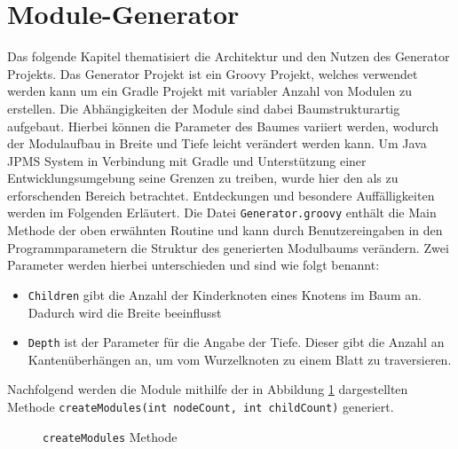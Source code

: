 
\section{Module-Generator}
\label{ch-generator}

Das folgende Kapitel thematisiert die Architektur und den Nutzen des Generator Projekts. 
Das Generator Projekt ist ein Groovy Projekt, welches verwendet werden kann um ein Gradle Projekt mit variabler Anzahl von Modulen zu erstellen.
Die Abhängigkeiten der Module sind dabei Baumstrukturartig aufgebaut.
Hierbei können die Parameter des Baumes variiert werden, wodurch der Modulaufbau in Breite und Tiefe leicht verändert werden kann. 
Um Java JPMS System in Verbindung mit Gradle und Unterstützung einer Entwicklungsumgebung seine Grenzen zu treiben, wurde hier den als zu erforschenden Bereich betrachtet. 
Entdeckungen und besondere Auffälligkeiten werden im Folgenden Erläutert.
Die Datei \texttt{Generator.groovy} enthält die Main Methode der oben erwähnten Routine und kann durch Benutzereingaben in den Programmparametern die Struktur des generierten Modulbaums verändern. 
Zwei Parameter werden hierbei unterschieden und sind wie folgt benannt:

\begin{itemize}
	\item \texttt{Children} gibt die Anzahl der Kinderknoten eines Knotens im Baum an. Dadurch wird die Breite beeinflusst
	\item \texttt{Depth} ist der Parameter für die Angabe der Tiefe. Dieser gibt die Anzahl an Kantenüberhängen an, um vom Wurzelknoten zu einem Blatt zu traversieren.
\end{itemize}

Nachfolgend werden die Module mithilfe der in Abbildung \ref{fig:createModules} dargestellten Methode \texttt{createModules(int nodeCount, int childCount)} generiert.

\begin{figure} [hbt!]
	
	\caption{\texttt{createModules} Methode}
	\label{fig:createModules}
\end{figure}


